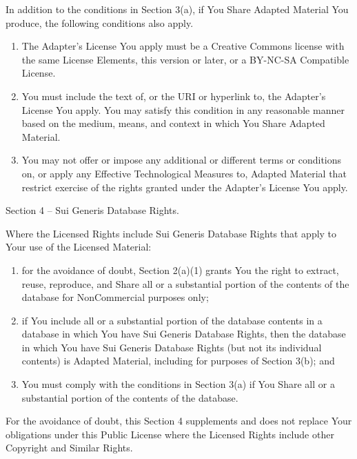 \documentclass[
]{scrbook}
\begin{document}
\begin{enumerate}
  In addition to the conditions in Section 3(a), if You Share Adapted
  Material You produce, the following conditions also apply.

  \begin{enumerate}
  \def\labelenumii{\arabic{enumii}.}
  \item
    The Adapter's License You apply must be a Creative Commons license
    with the same License Elements, this version or later, or a BY-NC-SA
    Compatible License.
  \item
    You must include the text of, or the URI or hyperlink to, the
    Adapter's License You apply. You may satisfy this condition in any
    reasonable manner based on the medium, means, and context in which
    You Share Adapted Material.
  \item
    You may not offer or impose any additional or different terms or
    conditions on, or apply any Effective Technological Measures to,
    Adapted Material that restrict exercise of the rights granted under
    the Adapter's License You apply.
  \end{enumerate}
\end{enumerate}

Section 4 -- Sui Generis Database Rights.

Where the Licensed Rights include Sui Generis Database Rights that apply
to Your use of the Licensed Material:

\begin{enumerate}
\def\labelenumi{\alph{enumi}.}
\item
  for the avoidance of doubt, Section 2(a)(1) grants You the right to
  extract, reuse, reproduce, and Share all or a substantial portion of
  the contents of the database for NonCommercial purposes only;
\item
  if You include all or a substantial portion of the database contents
  in a database in which You have Sui Generis Database Rights, then the
  database in which You have Sui Generis Database Rights (but not its
  individual contents) is Adapted Material, including for purposes of
  Section 3(b); and
\item
  You must comply with the conditions in Section 3(a) if You Share all
  or a substantial portion of the contents of the database.
\end{enumerate}

For the avoidance of doubt, this Section 4 supplements and does not
replace Your obligations under this Public License where the Licensed
Rights include other Copyright and Similar Rights.
\end{document}
